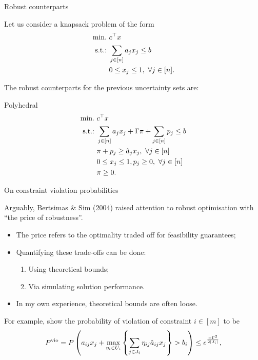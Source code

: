 \begin{frame}{Robust counterparts}

	Let us consider a knapsack problem of the form
	\begin{equation*}
	\begin{aligned}
		\mathop{\text{min.} \ } & c^\top x \\		
		\text{s.t.:~} & \sum_{j \in [n]} a_j x_j \le b \\
		& 0 \le x_j \le 1, \ \forall j \in [n].
	\end{aligned}
	\end{equation*}
	
	The \alert{robust counterparts} for the previous uncertainty sets are:
	
	\begin{block}{Polyhedral} 
		\vspace{-18pt}
		\begin{equation*}
		\begin{aligned}
			\mathop{\text{min.} \ } & c^\top x \\		
			\text{s.t.:~} & \sum_{j \in [n]} a_j x_j + \Gamma \pi + \sum_{j \in [n]} p_j \le b \\
			& \pi + p_j \ge \hat{a}_j x_j, \ \forall j \in [n] \\
			& 0 \le x_j \le 1, p_j \ge 0, \ \forall j \in [n] \\
			& \pi \ge 0.
		\end{aligned}
		\end{equation*}
	\end{block}
	
\end{frame}


\begin{frame}{On constraint violation probabilities}

	Arguably, \alert{Bertsimas \& Sim (2004)} raised attention to robust optimisation with ``the price of robustness''.
	\vspace{-6pt}
	\begin{itemize}
		\item The \alert{price} refers to the optimality traded off for feasibility guarantees;
		\item Quantifying these trade-offs can be done:
		\begin{enumerate}
			\item Using \alert{theoretical} bounds;
			\item Via \alert{simulating} solution performance.	
		\end{enumerate}
		\item In my own experience, theoretical bounds are often loose. 	
	\end{itemize}
	
	\pause
	For example, {\small \cite{bertsimas2004price}} show the probability of violation of constraint $i \in [m]$ to be
	\begin{equation*}
		P^{\text{vio}} = P\left(a_{ij}x_j + \max_{\eta_i \in U_i} \left\{ \sum_{j \in J_i}\eta_{ij}\hat{a}_{ij}x_j \right \} > b_i\right) \le e^{\frac{-\Gamma^2}{2|J_i|}},
	\end{equation*}	
	
\end{frame}


